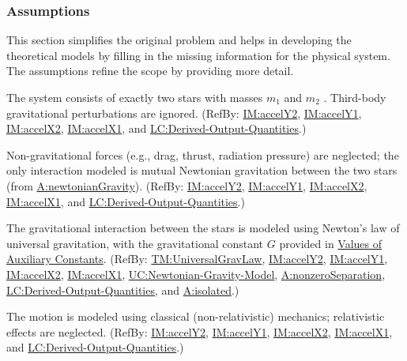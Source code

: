 \documentclass[12pt]{article}
\begin{document}
\subsubsection{Assumptions}
\label{Sec:Assumps}
This section simplifies the original problem and helps in developing the theoretical models by filling in the missing information for the physical system. The assumptions refine the scope by providing more detail.

\begin{description}[font=\normalfont]
\item[twoBody:\phantomsection\label{twoBody}]{The system consists of exactly two stars with masses ${m_{1}}$ and ${m_{2}}$ . Third-body gravitational perturbations are ignored. (RefBy: \hyperref[IM:accelY2]{IM:accelY2}, \hyperref[IM:accelY1]{IM:accelY1}, \hyperref[IM:accelX2]{IM:accelX2}, \hyperref[IM:accelX1]{IM:accelX1}, and \hyperref[lcDerivedOutputs]{LC:Derived-Output-Quantities}.)}
\item[isolated:\phantomsection\label{isolated}]{Non-gravitational forces (e.g., drag, thrust, radiation pressure) are neglected; the only interaction modeled is mutual Newtonian gravitation between the two stars (from \hyperref[newtonianGravity]{A:newtonianGravity}). (RefBy: \hyperref[IM:accelY2]{IM:accelY2}, \hyperref[IM:accelY1]{IM:accelY1}, \hyperref[IM:accelX2]{IM:accelX2}, \hyperref[IM:accelX1]{IM:accelX1}, and \hyperref[lcDerivedOutputs]{LC:Derived-Output-Quantities}.)}
\item[newtonianGravity:\phantomsection\label{newtonianGravity}]{The gravitational interaction between the stars is modeled using Newton's law of universal gravitation, with the gravitational constant $G$ provided in \hyperref[Sec:AuxConstants]{Values of Auxiliary Constants}. (RefBy: \hyperref[TM:UniversalGravLaw]{TM:UniversalGravLaw}, \hyperref[IM:accelY2]{IM:accelY2}, \hyperref[IM:accelY1]{IM:accelY1}, \hyperref[IM:accelX2]{IM:accelX2}, \hyperref[IM:accelX1]{IM:accelX1}, \hyperref[ucNewtonianGravity]{UC:Newtonian-Gravity-Model}, \hyperref[nonzeroSeparation]{A:nonzeroSeparation}, \hyperref[lcDerivedOutputs]{LC:Derived-Output-Quantities}, and \hyperref[isolated]{A:isolated}.)}
\item[nonRelativistic:\phantomsection\label{nonRelativistic}]{The motion is modeled using classical (non-relativistic) mechanics; relativistic effects are neglected. (RefBy: \hyperref[IM:accelY2]{IM:accelY2}, \hyperref[IM:accelY1]{IM:accelY1}, \hyperref[IM:accelX2]{IM:accelX2}, \hyperref[IM:accelX1]{IM:accelX1}, and \hyperref[lcDerivedOutputs]{LC:Derived-Output-Quantities}.)}

\end{description}
\end{document}
